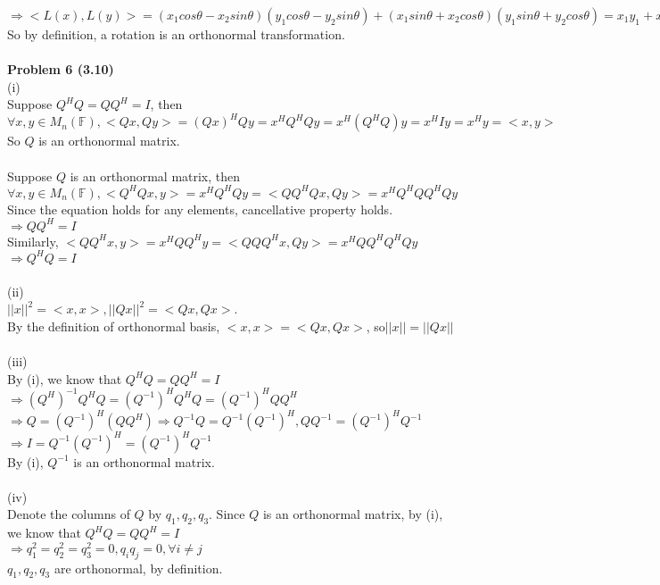 \documentclass[letterpaper,12pt]{article}
\theoremstyle{definition}
\begin{document}
$\Rightarrow <L(x), L(y)>=(x_1cos\theta-x_2sin\theta)(y_1cos\theta-y_2sin\theta)+(x_1sin\theta+x_2cos\theta)(y_1sin\theta+y_2cos\theta)=x_1y_1+x_2y_2 = <x,y>$\\
So by definition, a rotation is an orthonormal transformation.\\
\\
\noindent\textbf{Problem 6 (3.10)}\\
(i)\\
Suppose $Q^HQ = QQ^H = I$, then $\forall x, y\in M_n(\mathbb{F}),<Qx, Qy>=(Qx)^HQy=x^HQ^HQy = x^H(Q^HQ)y = x^H I y = x^H y=<x,y>$\\
So $Q$ is an orthonormal matrix.\\
\\
Suppose $Q$ is an orthonormal matrix, then $\forall x,y\in M_n(\mathbb{F}), <Q^HQx, y>=x^HQ^HQ y=<QQ^HQx, Qy>=x^HQ^HQQ^HQy$\\
Since the equation holds for any elements, cancellative property holds.\\
$\Rightarrow QQ^H=I$\\
Similarly, $<QQ^Hx, y>=x^HQQ^H y=<QQQ^Hx, Qy>=x^HQQ^HQ^HQy$\\
$\Rightarrow Q^HQ=I$\\
\\
(ii)\\
$||x||^2 = <x,x>, ||Qx||^2 = <Qx, Qx>$.\\
By the definition of orthonormal basis, $<x, x> = <Qx, Qx>$, so$||x|| = ||Qx||$\\
\\
(iii)\\
By (i), we know that $Q^HQ=QQ^H = I$\\
$\Rightarrow (Q^H)^{-1}Q^HQ = (Q^{-1})^HQ^HQ = (Q^{-1})^HQQ^H$\\
$\Rightarrow Q = (Q^{-1})^H(QQ^H) \Rightarrow Q^{-1}Q = Q^{-1}(Q^{-1})^H, QQ^{-1} = (Q^{-1})^HQ^{-1}$\\
$\Rightarrow I = Q^{-1}(Q^{-1})^H = (Q^{-1})^HQ^{-1}$\\
By (i), $Q^{-1}$ is an orthonormal matrix.\\
\\
(iv)\\
Denote the columns of $Q$ by $q_1, q_2, q_3$. Since $Q$ is an orthonormal matrix, by (i), we know that $Q^HQ = QQ^H = I$\\
$\Rightarrow q_1^2=q_2^2=q_3^2=0, q_iq_j = 0, \forall i\neq j$\\
$q_1, q_2, q_3$ are orthonormal, by definition.\\
\end{document}
